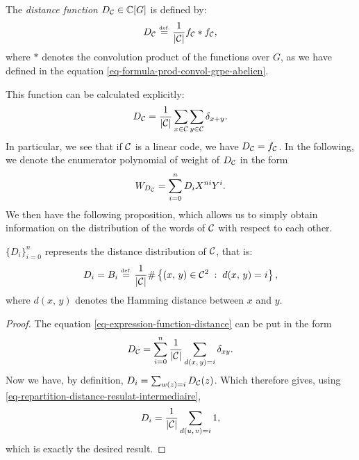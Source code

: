 \begin{defn}
 The \textit{distance function} $ D_{\mathcal{C}} \in \mathbb{C} [G] $ is defined by:
\begin{equation*}
D_{\mathcal{C}} \stackrel{\mbox{\upshape\tiny def.}}{=} \frac{1}{| \mathcal{C} |} f_{\mathcal{C}} * f_{\mathcal{C}},
\end{equation*}
where $ * $ denotes the convolution product of the functions over $ G $, as we have defined in the equation \eqref{eq-formula-prod-convol-grpe-abelien}.
\end{defn}
This function can be calculated explicitly:
\begin{equation}
\label{eq-expression-function-distance}
D_{\mathcal{C}} = \frac{1}{| \mathcal{C} |} \sum_{x \in \mathcal{C}}{\sum_{y \in \mathcal{C}}{\delta_{x + y}}}.
\end{equation}
In particular, we see that if $ \mathcal{C} $ is a linear code, we have $ D_{\mathcal{C}} = f_{\mathcal{C}} $. In the following, we denote the enumerator polynomial of weight of $ D_{\mathcal{C}} $ in the form
\begin{equation*}
W_{D_{\mathcal{C}}} = \sum_{i = 0}^n{D_i X^{ni} Y^i}.
\end{equation*}
We then have the following proposition, which allows us to simply obtain information on the distribution of the words of $ \mathcal{C} $ with respect to each other.
 
\begin{prop}
\label{prop-repartition-distance-dualite}
$ \{D_i\}_{i = 0}^{n} $ represents the distance distribution of $ \mathcal{C} $, that is:
\begin{equation*}
D_i = B_i \stackrel{\mbox{\upshape\tiny def.}}{=} \frac{1}{| \mathcal{C} |} \# \left\{ (x, \, y) \in \mathcal{C}^2 \;:\; d (x, \, y) = i \right\},
\end{equation*}
where $ d (x, \, y) $ denotes the Hamming distance between $ x $ and $ y $.
\end{prop}
\begin{proof}
The equation \eqref{eq-expression-function-distance} can be put in the form
\begin{equation}
\label{eq-repartition-distance-resulat-intermediaire}
D_{\mathcal{C}} = \sum_{i = 0}^n{\frac{1}{| \mathcal{C} |} \sum_{d (x, \, y) = i}{\delta_{xy}}}.
\end{equation}
Now we have, by definition, $ D_i = \sum_{w (z) = i}{D_{\mathcal{C}} (z)} $. Which therefore gives, using \eqref{eq-repartition-distance-resulat-intermediaire},
\begin{equation*}
D_i = \frac{1}{| \mathcal{C} |} \sum_{d (u, \, v) = i}{1},
\end{equation*}
which is exactly the desired result.
\end{proof}
 
